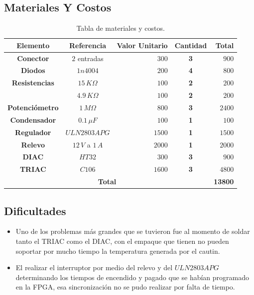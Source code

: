 \documentclass[12pt,graphicx,caption,rotating]{article}
\begin{document}
\subsection{Materiales Y Costos}
\begin{table}[H]
  \caption{Tabla de materiales y costos.}
  \centering
  \begin{tabular}{|c|c|r|c|r|}\hline
    \textbf{Elemento} & \textbf{Referencia} & \textbf{Valor Unitario} & \textbf{Cantidad} & \textbf{Total} \\ \hline
    \textbf{Conector} & $2$ entradas & $300$ & \textbf{3} & $900$ \\ \hline
    \textbf{Diodos} & $1n4004$ & $200$ & \textbf{4} & $800$ \\ \hline
    \multicolumn{ 1}{|c|}{\textbf{Resistencias}} & $15\, K\Omega$ & $100$ & \textbf{2} & $200$ \\ \cline{ 2- 5}
    \textbf{} & $4.9\, K\Omega$ & $100$ & \textbf{2} & $200$ \\ \hline
    \textbf{Potenciómetro} & $1\, M\Omega$ & $800$ & \textbf{3} & $2400$ \\ \hline
    \textbf{Condensador} & $0.1\, \mu F$ & $100$ & \textbf{1} & $100$ \\ \hline
    \textbf{Regulador} & $ULN2803APG$ & $1500$ & \textbf{1} & $1500$ \\ \hline
    \textbf{Relevo} & $12\, V$ a $1\, A$ & $2000$ & \textbf{1} & $2000$ \\ \hline
    \textbf{DIAC} & $HT32$ & $300$ & \textbf{3} & $900$ \\ \hline
    \textbf{TRIAC} & $C106$ & $1600$ & \textbf{3} & $4800$ \\ \hline
    \multicolumn{ 4}{|c|}{\textbf{Total}} & \textbf{13800} \\ \cline{ 5- 5}\hline
   \end{tabular}
   \label{tab1}
\end{table}

\subsection{Dificultades}
\begin{itemize}
 \item Uno de los problemas más grandes que se tuvieron fue al momento de soldar tanto el TRIAC como el DIAC, con el empaque que tienen no pueden soportar por mucho tiempo la temperatura generada por el cautin.
 \item El realizar el interruptor por medio del relevo y del $ULN2803APG$ determinando los tiempos de encendido y pagado que se habían programado en la FPGA, esa sincronización no se pudo realizar por falta de tiempo.
\end{itemize}
\end{document}
